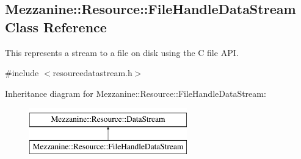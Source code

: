 \hypertarget{classMezzanine_1_1Resource_1_1FileHandleDataStream}{
\subsection{Mezzanine::Resource::FileHandleDataStream Class Reference}
\label{classMezzanine_1_1Resource_1_1FileHandleDataStream}
}


This represents a stream to a file on disk using the C file API.  




{\ttfamily \#include $<$resourcedatastream.h$>$}

Inheritance diagram for Mezzanine::Resource::FileHandleDataStream:\begin{figure}[H]
\begin{center}
\leavevmode
\includegraphics[height=2.000000cm]{classMezzanine_1_1Resource_1_1FileHandleDataStream}
\end{center}
\end{figure}
